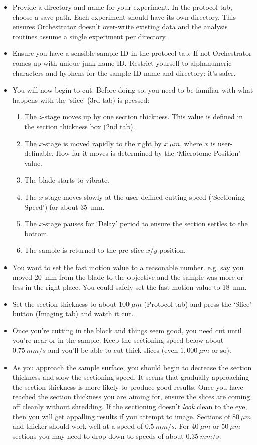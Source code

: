 \documentclass[paper=a4, fontsize=11pt]{scrartcl} %
\numberwithin{equation}{section} %
\numberwithin{figure}{section} %
\numberwithin{table}{section} %
\begin{document}
\begin{itemize}
\begin{enumerate}
\end{enumerate}
\item Provide a directory and name for your experiment. 
In the protocol tab, choose a save path. 
Each experiment should have its own directory.
This ensures Orchestrator doesn't over-write existing data and the analysis routines assume a single experiment per directory. 
\item Ensure you have a sensible sample ID in the protocol tab. 
If not Orchestrator comes up with unique junk-name ID.
Restrict yourself to alphanumeric characters and hyphens for the sample ID name and directory: it's safer.
\item You will now begin to cut. 
  Before doing so, you need to be familiar with what happens with the `slice' (3rd tab) is pressed:
 \begin{enumerate}
  \item The $z$-stage moves up by one section thickness. This value is defined in the section thickness box (2nd tab).
  \item The $x$-stage is moved rapidly to the right by $x~\mu m$, where $x$ is user-definable. How far it moves is determined by the 
  `Microtome Position' value. 
  \item The blade starts to vibrate.
  \item The $x$-stage moves slowly at the user defined cutting speed (`Sectioning Speed') for about 35~mm.
  \item The $x$-stage pauses for `Delay' period to ensure the section settles to the bottom. 
  \item The sample is returned to the pre-slice $x$/$y$ position. 
 \end{enumerate}
\item You want to set the fast motion value to a reasonable number. e.g. say you moved 20~mm from the 
blade to the objective and the sample was more or less in the right place. You could safely set the fast motion value to 18~mm.

\item Set the section thickness to about $100~\mu m$ (Protocol tab) and press the `Slice' button (Imaging tab) and watch it cut. 

\item Once you're cutting in the block and things seem good, you need cut until you're near or in the sample. 
Keep the sectioning speed below about $0.75~mm/s$ and you'll be able to cut thick slices (even $1,000~\mu m$ or so). 

\item As you approach the sample surface, you should begin to decrease the section thickness and slow the sectioning speed. 
It seems that gradually approaching the section thickness is more likely to produce good results. 
Once you have reached the section thickness you are aiming for, ensure the slices are coming off cleanly without shredding.
If the sectioning doesn't \textit{look} clean to the eye, then you will get appalling results if you attempt to image. 
Sections of $80~\mu m$ and thicker should work well at a speed of $0.5~mm/s$. 
For $40~\mu m$ or $50~\mu m$ sections you may need to drop down to speeds of about $0.35~mm/s$.
\end{itemize}
\end{document}
